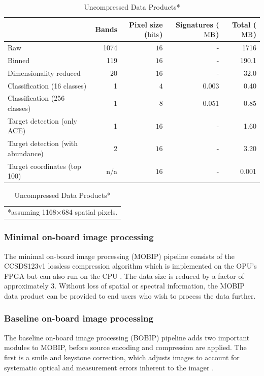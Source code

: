 \begin{table}[htbp]
	\caption{Uncompressed Data Products*} %
	\label{tab:data-products}
	\centering
	\begin{tabular}{l | r r r r}
	\hline
	& Bands & Pixel size ($\rm{bits}$) & Signatures ($\rm{MB}$) & Total ($\rm{MB}$) \\
	\hline
	Raw & 1074 & $16$& - & 1716 \\
	Binned & 119 & $16$ & - & 190.1 \\
	Dimensionality reduced & 20 & $16$ & - & 32.0 \\
	Classification (16 classes) & 1 & $4$ & 0.003 & 0.40 \\
	Classification (256 classes) & 1 & $8$ & 0.051 & 0.85 \\
	Target detection (only ACE) & 1 & $16$ & - & 1.60\\
	Target detection (with abundance) & 2 & $16$ & - & 3.20 \\
	Target coordinates (top 100) & n/a & $16$ & - & 0.001 \\
	\hline
	\end{tabular}
	
	\begin{tabular}{c}
		*assuming 1168$\times$684 spatial pixels. %
	\end{tabular}
	\vspace*{-\baselineskip}

\end{table}
\subsubsection{Minimal on-board image processing}
The minimal on-board image processing (MOBIP) pipeline consists of the CCSDS123v1 lossless compression algorithm which is implemented on the OPU's FPGA but can also run on the CPU \cite{Fjeldtvedt2018, orlandic_parallel_2019}. The data size is reduced by a factor of approximately 3. Without loss of spatial or spectral information, the MOBIP data product can be provided to end users who wish to process the data further.  

\subsubsection{Baseline on-board image processing}
The baseline on-board image processing (BOBIP) pipeline adds two important modules to MOBIP, before source encoding and compression are applied. 
The first is a smile and keystone correction, which adjusts images to account for systematic optical and measurement errors inherent to the imager \cite{Henriksen2019}. 

